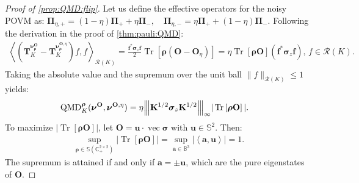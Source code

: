\documentclass[noinfoline]{imsart}\setcounter{tocdepth}{2}
\renewcommand{\b}[1]{\mathbb{#1}} %
\newcommand{\m}[1]{\mathbf{#1}} %
\renewcommand{\c}[1]{\mathcal{#1}} %
\newcommand{\mb}[1]{\boldsymbol{#1}} %
\newcommand{\tr}[1]{\operatorname{Tr}\left[#1\right]}
\newcommand{\vertiii}[1]{{\left\vert\kern-0.25ex\left\vert\kern-0.25ex\left\vert #1 
    \right\vert\kern-0.25ex\right\vert\kern-0.25ex\right\vert}} %
\newcommand{\innpr}[2]{{\left\langle {#1},{#2}\right\rangle}} %
\newcommand{\QMD}{\operatorname{QMD}}
\renewcommand{\vec}{\operatorname{vec}}
\theoremstyle{plain}
\begin{document}
\begin{appendix}
\begin{proof}[Proof of \cref{prop:QMD:flip}]
Let us define the effective operators for the noisy POVM as: $\m{\Pi}_{\eta, +} = (1-\eta) \m{\Pi}_{+} + \eta \m{\Pi}_{-}, \quad \m{\Pi}_{\eta, -} = \eta \m{\Pi}_{+} + (1-\eta) \m{\Pi}_{-}$.
Following the derivation in the proof of \cref{thm:pauli:QMD}:
\begin{align*}
    \innpr{(\m{T}_{K}^{\mb{\nu}^{\m{O}}_{\mb{\rho}}} - \m{T}_{K}^{\mb{\nu}^{\m{O}, \eta}_{\mb{\rho}}}) f}{f}_{\c{R}(K)} 
    = \frac{\m{f}^* \mb{\sigma}_{z} \m{f}}{2} \tr{\mb{\rho} (\m{O} - \m{O}_{\eta})} = \eta \tr{\mb{\rho} \m{O}} (\m{f}^* \mb{\sigma}_{z} \m{f}), \, f \in \c{R}(K).
\end{align*}
Taking the absolute value and the supremum over the unit ball $\|f\|_{\c{R}(K)} \le 1$ yields:
\begin{align*}
    \QMD_{K}^{\mb{\rho}}(\mb{\nu}^{\m{O}}, \mb{\nu}^{\m{O}, \eta}) 
    &= \eta \vertiii{\m{K}^{1/2} \mb{\sigma}_{z} \m{K}^{1/2}}_{\infty} |\tr{\mb{\rho} \m{O}}|.
\end{align*}
To maximize $|\tr{\mb{\rho} \m{O}}|$, let $\m{O} = \m{u} \cdot \vec{\mb{\sigma}}$ with $\m{u} \in \b{S}^{2}$. Then:
\begin{align*}
    \sup_{\mb{\rho} \in \b{S}(\b{C}_{+}^{2 \times 2})} |\tr{\mb{\rho} \m{O}}| = \sup_{\m{a} \in \b{B}^{3}} |\innpr{\m{a}}{\m{u}}| = 1.
\end{align*}
The supremum is attained if and only if $\m{a} = \pm \m{u}$, which are the pure eigenstates of $\m{O}$.
\end{proof}




\end{appendix}
\end{document}
